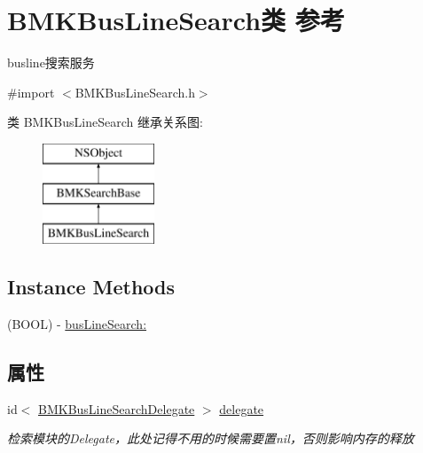 \hypertarget{interface_b_m_k_bus_line_search}{}\section{B\+M\+K\+Bus\+Line\+Search类 参考}
\label{interface_b_m_k_bus_line_search}


busline搜索服务  




{\ttfamily \#import $<$B\+M\+K\+Bus\+Line\+Search.\+h$>$}

类 B\+M\+K\+Bus\+Line\+Search 继承关系图\+:\begin{figure}[H]
\begin{center}
\leavevmode
\includegraphics[height=3.000000cm]{interface_b_m_k_bus_line_search}
\end{center}
\end{figure}
\subsection*{Instance Methods}
\begin{DoxyCompactItemize}
\item 
(B\+O\+O\+L) -\/ \hyperlink{interface_b_m_k_bus_line_search_a652cac8a9fbaa46ddd7a0b09f5af8644}{bus\+Line\+Search\+:}
\end{DoxyCompactItemize}
\subsection*{属性}
\begin{DoxyCompactItemize}
\item 
\hypertarget{interface_b_m_k_bus_line_search_a87ccf434516c41498d6744f988e748a4}{}id$<$ \hyperlink{protocol_b_m_k_bus_line_search_delegate-p}{B\+M\+K\+Bus\+Line\+Search\+Delegate} $>$ \hyperlink{interface_b_m_k_bus_line_search_a87ccf434516c41498d6744f988e748a4}{delegate}\label{interface_b_m_k_bus_line_search_a87ccf434516c41498d6744f988e748a4}

\begin{DoxyCompactList}\small\item\em 检索模块的\+Delegate，此处记得不用的时候需要置nil，否则影响内存的释放 \end{DoxyCompactList}\end{DoxyCompactItemize}



